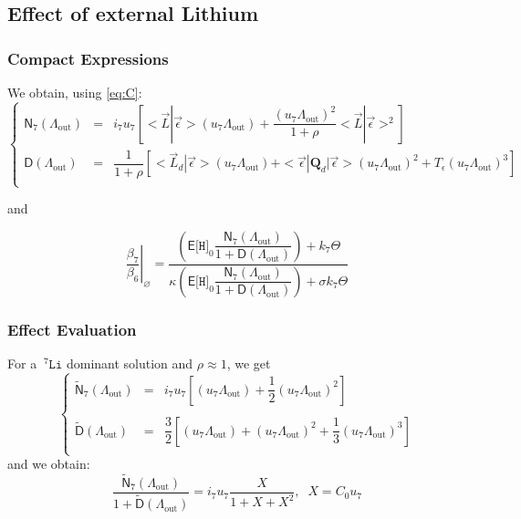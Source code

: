 \documentclass[aps,onecolumn,11pt]{revtex4}
\newcommand{\mychem}[1]{\mathtt{#1}}
\newcommand{\myconc}[1]{\big[#1\big]}
\newcommand{\spLi}[1]{{\!~^{#1}\mychem{Li}}}
\newcommand{\spproton}{\mychem{H}}
\newcommand{\proton}{\myconc{\spproton}}
\newcommand{\myout}[1]{{#1}_{\mathrm{out}}}
\newcommand{\mymat}[1]{{\bm{#1}}}
\newcommand{\LiAll}{\Lambda}
\newcommand{\LiAllOut}{\myout{\LiAll}}
\begin{document}
\subsection{Effect of external Lithium}
\subsubsection{Compact Expressions}
We obtain, using \eqref{eq:C}:
\begin{equation}
\left\lbrace
\begin{array}{rcl}
	\mathsf{N}_7(\LiAllOut) & = & i_7u_7 \left[ <\vec{L}|\vec{\epsilon}> (u_7\LiAllOut) +  \dfrac{\left(u_7\LiAllOut\right)^2}{1+\rho}  <\vec{L}|\vec{\epsilon}>^2 \right]\\
	\mathsf{D}(\LiAllOut)   & = & \dfrac{1}{1+\rho} \left[ <\vec{L}_d|\vec{\epsilon}> (u_7\LiAllOut) + <\vec{\epsilon}|\mymat{Q}_d|\vec{\epsilon}>\left(u_7\LiAllOut\right)^2 
	+  T_\epsilon \left(u_7\LiAllOut\right)^3\right]\\
\end{array}
\right.
\end{equation}

and

\begin{equation}
\left.\dfrac{\beta_7}{\beta_6}\right\vert_{\varnothing} = 
\dfrac{
	\left(\mathsf{E}\proton_0 \dfrac{\mathsf{N}_7(\LiAllOut)}{1+\mathsf{D}(\LiAllOut)}\right) + k_7 \Theta 
}
{
	\kappa \left(\mathsf{E}\proton_0 \dfrac{\mathsf{N}_7(\LiAllOut)}{1+\mathsf{D}(\LiAllOut)}\right) + \sigma k_7 \Theta 
}
\end{equation}


\subsubsection{Effect Evaluation}
For a $\spLi{7}$ dominant solution and $\rho\approx1$, we get
\begin{equation}
\left\lbrace
\begin{array}{rcl}
	\widetilde{\mathsf{N}}_7(\LiAllOut) & = &  {i_7 u_7}  \left[ \left(u_7\LiAllOut\right) + \dfrac{1}{2} \left(u_7\LiAllOut\right)^2\right]\\
	\\
	\widetilde{\mathsf{D}}(\LiAllOut)   & = & \dfrac{3}{2} \left[  \left(u_7\LiAllOut\right) + \left(u_7\LiAllOut\right)^2 + \dfrac{1}{3} \left(u_7\LiAllOut\right)^3 \right] \\
\end{array}
\right.
\end{equation}
and we obtain:
\begin{equation}
	\dfrac{\widetilde{\mathsf{N}}_7(\LiAllOut)}{1+\widetilde{\mathsf{D}}(\LiAllOut)} =  {i_7 u_7} \dfrac{X}{1+X+X^2},\;\; X=C_0u_7
\end{equation}
\end{document}
